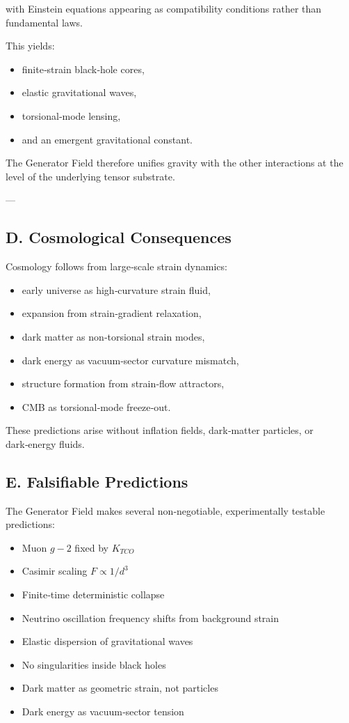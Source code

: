 \documentclass[reprint,amsmath,amssymb,aps,prl,floatfix]{revtex4-2}
\begin{document}
\begin{itemize}
with Einstein equations appearing as compatibility conditions rather than fundamental laws.

This yields:

\begin{itemize}
\item finite‑strain black‑hole cores,  
\item elastic gravitational waves,  
\item torsional‑mode lensing,  
\item and an emergent gravitational constant.
\end{itemize}

The Generator Field therefore unifies gravity with the other interactions at the level of the underlying tensor substrate.

---

\subsection{D. Cosmological Consequences}

Cosmology follows from large‑scale strain dynamics:

\begin{itemize}
\item early universe as high‑curvature strain fluid,  
\item expansion from strain‑gradient relaxation,  
\item dark matter as non‑torsional strain modes,  
\item dark energy as vacuum‑sector curvature mismatch,  
\item structure formation from strain‑flow attractors,  
\item CMB as torsional‑mode freeze‑out.
\end{itemize}

These predictions arise without inflation fields, dark‑matter particles, or dark‑energy fluids.

\subsection{E. Falsifiable Predictions}

The Generator Field makes several non‑negotiable, experimentally testable predictions:

\begin{itemize}
\item Muon \(g-2\) fixed by \(K_{TCO}\)  
\item Casimir scaling \(F \propto 1/d^3\)  
\item Finite‑time deterministic collapse  
\item Neutrino oscillation frequency shifts from background strain  
\item Elastic dispersion of gravitational waves  
\item No singularities inside black holes  
\item Dark matter as geometric strain, not particles  
\item Dark energy as vacuum‑sector tension  
\end{itemize}


\end{itemize}
\end{document}
